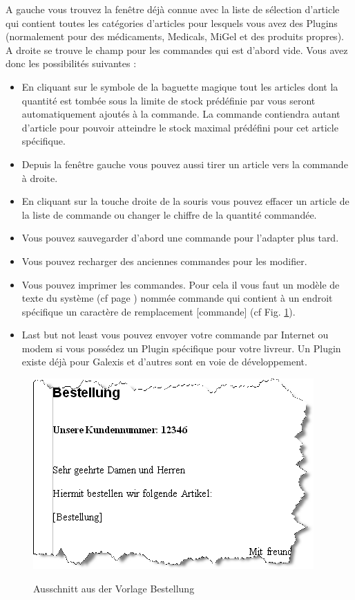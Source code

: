 A gauche vous trouvez la fenêtre déjà connue avec la liste de sélection d'article qui contient
toutes les catégories d'articles pour lesquels vous avez des Plugins (normalement pour des médicaments, Medicals, MiGel et des produits propres). 
A droite se trouve le champ pour les commandes qui est d'abord vide. Vous avez donc les possibilités suivantes :

\begin{itemize}
  \item En cliquant sur le symbole de la baguette magique tout les articles dont la quantité est tombée sous la limite de stock prédéfinie par vous seront automatiquement ajoutés à la commande. La commande contiendra autant d'article pour pouvoir atteindre le stock maximal prédéfini pour cet article spécifique.
  \item Depuis la fenêtre gauche vous pouvez aussi tirer un article vers la commande à droite.
	\item En cliquant sur la touche droite de la souris vous pouvez effacer un article de la liste de commande ou changer le chiffre de la quantité commandée.
	\item Vous pouvez sauvegarder d'abord une commande pour l'adapter plus tard. 
	
	\item Vous pouvez recharger des anciennes commandes pour les modifier.
	\item Vous pouvez imprimer les commandes. Pour cela il vous faut un modèle de texte du système (cf page
	\pageref{textvorlagen}) nommée  \glqq commande\grqq{} qui contient à un endroit spécifique un caractère de remplacement  [commande] (cf Fig. \ref{fig:bestell2}).
	\item Last but not least vous pouvez envoyer votre commande par Internet ou modem si vous possédez un Plugin spécifique pour votre livreur. Un Plugin existe déjà pour Galexis et d'autres sont en voie de développement.
\end{itemize}
\begin{figure}[hb]
  \includegraphics{images/bestell2}\\
  \caption{Ausschnitt aus der Vorlage Bestellung}\label{fig:bestell2}
\end{figure}




